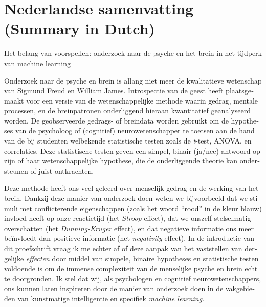 \documentclass[12pt,american,a4paper,oneside,]{memoir} %
\newenvironment{dutch}[2][]{\begin{otherlanguage}{dutch}}{\end{otherlanguage}}
\begin{document}
\normalsize
\setlength{\parindent}{1.5em}

\hypertarget{nederlandse-samenvatting-summary-in-dutch}{%
\chapter*{Nederlandse samenvatting (Summary in Dutch)}\label{nederlandse-samenvatting-summary-in-dutch}}


\begin{dutch}

\emph{Het belang van voorspellen: onderzoek naar de psyche en het brein in het tijdperk van machine learning}

\bigskip

Onderzoek naar de psyche en brein is allang niet meer de kwalitatieve wetenschap van Sigmund Freud en William James. Introspectie van de geest heeft plaatsgemaakt voor een versie van de wetenschappelijke methode waarin gedrag, mentale processen, en de breinpatronen onderliggend hieraan kwantitatief geanalyseerd worden. De geobserveerde gedrags- of breindata worden gebruikt om de hypotheses van de psycholoog of (cognitief) neurowetenschapper te toetsen aan de hand van de bij studenten welbekende statistische testen zoals de \emph{t}-test, ANOVA, en correlaties. Deze statistische testen geven een simpel, binair (ja/nee) antwoord op zijn of haar wetenschappelijke hypothese, die de onderliggende theorie kan ondersteunen of juist ontkrachten.

Deze methode heeft ons veel geleerd over menselijk gedrag en de werking van het brein. Dankzij deze manier van onderzoek doen weten we bijvoorbeeld dat we stimuli met conflicterende eigenschappen (zoals het woord ``rood'' in de kleur blauw) invloed heeft op onze reactietijd (het \emph{Stroop} effect), dat we onszelf stelselmatig overschatten (het \emph{Dunning-Kruger} effect), en dat negatieve informatie ons meer beïnvloedt dan positieve informatie (het \emph{negativity} effect). In de introductie van dit proefschrift vraag ik me echter af of deze aanpak van het vaststellen van dergelijke \emph{effecten} door middel van simpele, binaire hypotheses en statistische testen voldoende is om de immense complexiteit van de menselijke psyche en brein echt te doorgronden. Ik stel dat wij, als psychologen en cognitief neurowetenschappers, ons kunnen laten inspireren door de manier van onderzoek doen in de vakgebieden van kunstmatige intelligentie en specifiek \emph{machine learning}.


\end{dutch}
\end{document}
